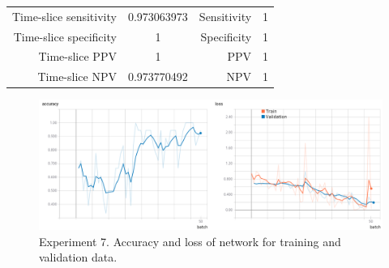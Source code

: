 \documentclass[preprint,12pt]{elsarticle}
\begin{document}
\begin{table}
{\begin{tabular}{ | c | c | c | c | c | c | c | c | }
		\multicolumn{2}{|r|}{Time-slice sensitivity} & 
		\multicolumn{2}{c|}{ 0.973063973 } &
		\multicolumn{2}{|r|}{Sensitivity} & 
		\multicolumn{2}{c|}{ 1 } \\ 
		
		\multicolumn{2}{|r|}{Time-slice specificity} & 
		\multicolumn{2}{c|}{ 1 } &
		\multicolumn{2}{|r|}{Specificity} & 
		\multicolumn{2}{c|}{ 1 } \\ 
		
		\multicolumn{2}{|r|}{Time-slice PPV} & 
		\multicolumn{2}{c|}{ 1 } &
		\multicolumn{2}{|r|}{PPV} & 
		\multicolumn{2}{c|}{ 1 } \\ 
		
		\multicolumn{2}{|r|}{Time-slice NPV} & 
		\multicolumn{2}{c|}{ 0.973770492 } &
		\multicolumn{2}{|r|}{NPV} & 
		\multicolumn{2}{c|}{ 1 } \\ \hline
	\end{tabular}
}
\label{table:tests_7}
\end{table}
\begin{figure}
\includegraphics[width=\linewidth]{images/tests_7}
\caption{Experiment 7. Accuracy and loss of network for training and validation data.}
\label{fig:tests_7}
\end{figure}
\end{document}
